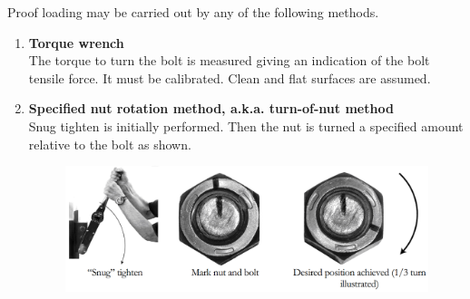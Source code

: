 Proof loading may be carried out by any of the following methods.
\begin{enumerate}
\item \textbf{Torque wrench}\\The torque to turn the bolt is measured  giving an indication of the bolt tensile force. It must be calibrated. Clean and flat surfaces are assumed.
\item \textbf{Specified nut rotation method, a.k.a. turn-of-nut method}\\Snug tighten is initially performed. Then the nut is turned a specified amount relative to the bolt as shown.
\begin{figure}[H]
\centering\includegraphics[scale=.25]{PIC/CH06/TON}
\end{figure}


\end{enumerate}
